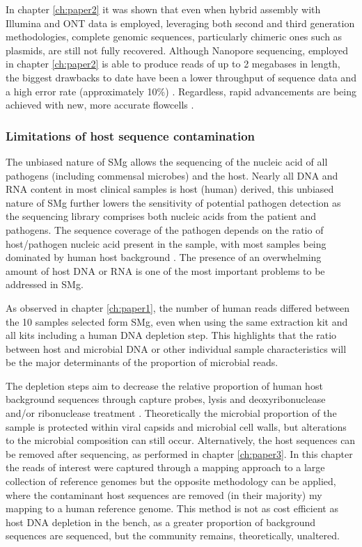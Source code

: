In chapter \ref{ch:paper2} it was shown that even when hybrid assembly with Illumina and \ac{ONT} data is employed, leveraging both second and third generation methodologies, complete genomic sequences, particularly chimeric ones such as plasmids, are still not fully recovered. Although Nanopore sequencing, employed in chapter \ref{ch:paper2} is able to produce reads of up to 2 megabases in length, the biggest drawbacks to date have been a lower throughput of sequence data and a high error rate (approximately 10\%) \citep{petersen_third-generation_2019}. Regardless, rapid advancements are being achieved with new, more accurate flowcells \citep{sereika_oxford_2021}. 

\subsubsection{Limitations of host sequence contamination}

The unbiased nature of \ac{SMg} allows the sequencing of the nucleic acid of all pathogens (including commensal microbes) and the host. Nearly all \ac{DNA} and \ac{RNA} content in most clinical samples is host (human) derived, this unbiased nature of SMg further lowers the sensitivity of potential pathogen detection as the sequencing library comprises both nucleic acids from the patient and pathogens. The sequence coverage of the pathogen depends on the ratio of host/pathogen nucleic acid present in the sample, with most samples being dominated by human host background \citep{gu_clinical_2019}. The presence of an overwhelming amount of host \ac{DNA} or \ac{RNA} is one of the most important problems to be addressed in \ac{SMg}.

As observed in chapter \ref{ch:paper1}, the number of human reads differed between the 10 samples selected form \ac{SMg}, even when using the same extraction kit and all kits including a human DNA depletion step. This highlights that the ratio between host and microbial DNA or other individual sample characteristics will be the major determinants of the proportion of microbial reads.

The depletion steps aim to decrease the relative proportion of human host background sequences through capture probes, lysis and deoxyribonuclease and/or ribonuclease treatment \citep{gu_clinical_2019}. Theoretically the microbial proportion of the sample is protected within viral capsids and microbial cell walls, but alterations to the microbial composition can still occur. Alternatively, the host sequences can be removed after sequencing, as performed in chapter \ref{ch:paper3}. In this chapter the reads of interest were captured through a mapping approach to a large collection of reference genomes but the opposite methodology can be applied, where the contaminant host sequences are removed (in their majority) my mapping to a human reference genome. This method is not as cost efficient as host DNA depletion in the bench, as a greater proportion of background sequences are sequenced, but the community remains, theoretically, unaltered. 

